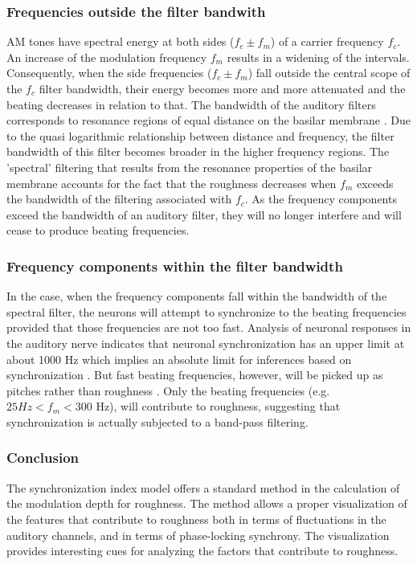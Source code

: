\subsubsection*{Frequencies outside the filter bandwith}
AM tones have spectral energy at both sides ($f_c \pm f_m$) of a
carrier frequency $f_c$. An increase of the modulation frequency
$f_m$ results in a widening of the intervals. Consequently, when
the side frequencies ($f_c \pm f_m$) fall outside the central
scope of the $f_c$ filter bandwidth, their energy becomes more
and more attenuated and the beating decreases in relation to
that. The bandwidth of the auditory filters corresponds to
resonance regions of equal distance on the basilar membrane
\cite{GreenwoodJoris:1996}. Due to the quasi logarithmic
relationship between distance and frequency, the filter bandwidth
of this filter becomes broader in the higher frequency regions.
The 'spectral' filtering that results from the resonance
properties of the basilar membrane accounts for the fact that the
roughness decreases when $f_m$ exceeds the bandwidth of the
filtering associated with $f_c$. As the frequency components
exceed the bandwidth of an auditory filter, they will no longer
interfere and will cease to produce beating frequencies.

\subsubsection*{Frequency components within the filter bandwidth}
In the case, when the frequency components fall within the
bandwidth of the spectral filter, the neurons will attempt to
synchronize to the beating frequencies provided that those
frequencies are not too fast. Analysis of neuronal responses in
the auditory nerve indicates that neuronal synchronization has an
upper limit at about 1000 Hz which implies an absolute limit for
inferences based on synchronization \cite{JorisYin:1992}. But fast
beating frequencies, however, will be picked up as pitches rather
than roughness \cite{SchreinerLangnerNeuro:88a}. Only the beating
frequencies (e.g.~$25 Hz < f_m < 300$ Hz), will contribute to
roughness, suggesting that synchronization is actually subjected
to a band-pass filtering.

\subsubsection*{Conclusion}
The synchronization index model offers a standard method in the
calculation of the modulation depth for roughness. The method
allows a proper visualization of the features that contribute to
roughness both in terms of fluctuations in the auditory channels,
and in terms of phase-locking synchrony. The visualization
provides interesting cues for analyzing the factors that
contribute to roughness.

